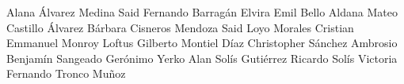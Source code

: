 Alana Álvarez Medina
Said Fernando Barragán Elvira
Emil Bello Aldana
Mateo Castillo Álvarez
Bárbara Cisneros Mendoza
Said Loyo Morales
Cristian Emmanuel Monroy Loftus
Gilberto Montiel Díaz
Christopher Sánchez Ambrosio
Benjamín Sangeado Gerónimo
Yerko Alan Solís Gutiérrez
Ricardo Solís Victoria
Fernando Tronco Muñoz